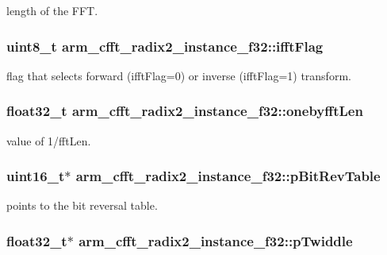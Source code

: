 length of the F\-F\-T. \hypertarget{structarm__cfft__radix2__instance__f32_a8dbe98d2c924e35e0a3fed2fe948176f}{
\subsubsection[{ifft\-Flag}]{\setlength{\rightskip}{0pt plus 5cm}uint8\-\_\-t arm\-\_\-cfft\-\_\-radix2\-\_\-instance\-\_\-f32\-::ifft\-Flag}}\label{structarm__cfft__radix2__instance__f32_a8dbe98d2c924e35e0a3fed2fe948176f}
flag that selects forward (ifft\-Flag=0) or inverse (ifft\-Flag=1) transform. \hypertarget{structarm__cfft__radix2__instance__f32_a1d3d289d47443e597d88a40effd14b8f}{
\subsubsection[{onebyfft\-Len}]{\setlength{\rightskip}{0pt plus 5cm}float32\-\_\-t arm\-\_\-cfft\-\_\-radix2\-\_\-instance\-\_\-f32\-::onebyfft\-Len}}\label{structarm__cfft__radix2__instance__f32_a1d3d289d47443e597d88a40effd14b8f}
value of 1/fft\-Len. \hypertarget{structarm__cfft__radix2__instance__f32_a92b8fa0a151cd800436094903a5ca0a4}{
\subsubsection[{p\-Bit\-Rev\-Table}]{\setlength{\rightskip}{0pt plus 5cm}uint16\-\_\-t$\ast$ arm\-\_\-cfft\-\_\-radix2\-\_\-instance\-\_\-f32\-::p\-Bit\-Rev\-Table}}\label{structarm__cfft__radix2__instance__f32_a92b8fa0a151cd800436094903a5ca0a4}
points to the bit reversal table. \hypertarget{structarm__cfft__radix2__instance__f32_adb0c9d47dbfbd90a6f6ed0a05313a974}{
\subsubsection[{p\-Twiddle}]{\setlength{\rightskip}{0pt plus 5cm}float32\-\_\-t$\ast$ arm\-\_\-cfft\-\_\-radix2\-\_\-instance\-\_\-f32\-::p\-Twiddle}}\label{structarm__cfft__radix2__instance__f32_adb0c9d47dbfbd90a6f6ed0a05313a974}
